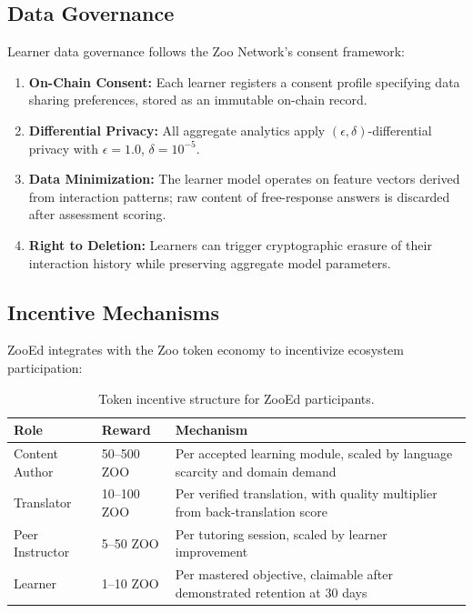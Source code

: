 \subsection{Data Governance}

Learner data governance follows the Zoo Network's consent framework:

\begin{enumerate}[leftmargin=*]
    \item \textbf{On-Chain Consent:} Each learner registers a consent profile specifying data sharing preferences, stored as an immutable on-chain record.
    \item \textbf{Differential Privacy:} All aggregate analytics apply $(\epsilon, \delta)$-differential privacy with $\epsilon = 1.0$, $\delta = 10^{-5}$.
    \item \textbf{Data Minimization:} The learner model operates on feature vectors derived from interaction patterns; raw content of free-response answers is discarded after assessment scoring.
    \item \textbf{Right to Deletion:} Learners can trigger cryptographic erasure of their interaction history while preserving aggregate model parameters.
\end{enumerate}

\subsection{Incentive Mechanisms}

ZooEd integrates with the Zoo token economy to incentivize ecosystem participation:

\begin{table}[H]
\centering
\caption{Token incentive structure for ZooEd participants.}
\label{tab:incentives}
\begin{tabularx}{\textwidth}{@{}llX@{}}
\toprule
\textbf{Role} & \textbf{Reward} & \textbf{Mechanism} \\
\midrule
Content Author & 50--500 ZOO & Per accepted learning module, scaled by language scarcity and domain demand \\
Translator & 10--100 ZOO & Per verified translation, with quality multiplier from back-translation score \\
Peer Instructor & 5--50 ZOO & Per tutoring session, scaled by learner improvement \\
Learner & 1--10 ZOO & Per mastered objective, claimable after demonstrated retention at 30 days \\
\bottomrule
\end{tabularx}
\end{table}

